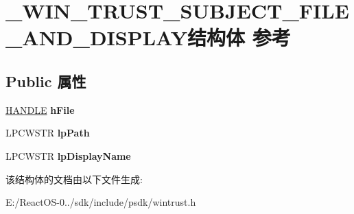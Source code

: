 \hypertarget{struct___w_i_n___t_r_u_s_t___s_u_b_j_e_c_t___f_i_l_e___a_n_d___d_i_s_p_l_a_y}{}\section{\+\_\+\+W\+I\+N\+\_\+\+T\+R\+U\+S\+T\+\_\+\+S\+U\+B\+J\+E\+C\+T\+\_\+\+F\+I\+L\+E\+\_\+\+A\+N\+D\+\_\+\+D\+I\+S\+P\+L\+A\+Y结构体 参考}
\label{struct___w_i_n___t_r_u_s_t___s_u_b_j_e_c_t___f_i_l_e___a_n_d___d_i_s_p_l_a_y}
\subsection*{Public 属性}
\begin{DoxyCompactItemize}
\item 
\mbox{\label{struct___w_i_n___t_r_u_s_t___s_u_b_j_e_c_t___f_i_l_e___a_n_d___d_i_s_p_l_a_y_ad091fc196da304dccff5adebfe38529c}} 
\hyperlink{interfacevoid}{H\+A\+N\+D\+LE} {\bfseries h\+File}
\item 
\mbox{\label{struct___w_i_n___t_r_u_s_t___s_u_b_j_e_c_t___f_i_l_e___a_n_d___d_i_s_p_l_a_y_a76e3eefcc20b0f0f68a7de19e30fddc3}} 
L\+P\+C\+W\+S\+TR {\bfseries lp\+Path}
\item 
\mbox{\label{struct___w_i_n___t_r_u_s_t___s_u_b_j_e_c_t___f_i_l_e___a_n_d___d_i_s_p_l_a_y_a63b17b38fc9e773a8564a8a141b7c836}} 
L\+P\+C\+W\+S\+TR {\bfseries lp\+Display\+Name}
\end{DoxyCompactItemize}


该结构体的文档由以下文件生成\+:\begin{DoxyCompactItemize}
\item 
E\+:/\+React\+O\+S-\/0../sdk/include/psdk/wintrust.\+h\end{DoxyCompactItemize}
